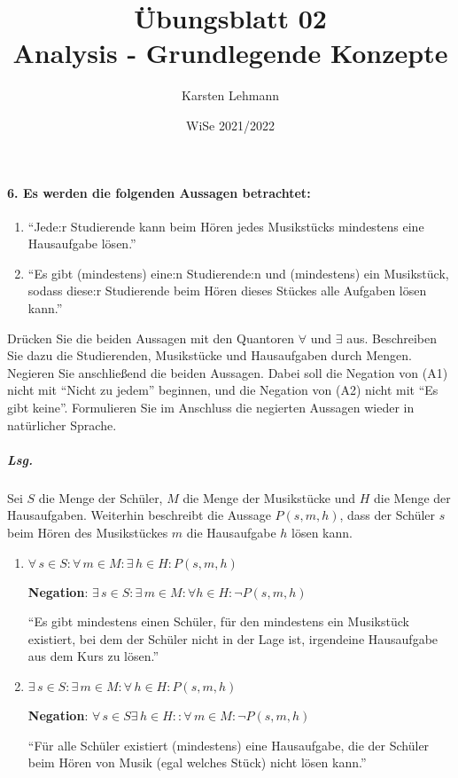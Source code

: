 \documentclass{scrreprt}
\author{Karsten Lehmann}
\date{WiSe 2021/2022}
\title{Übungsblatt 02\\Analysis - Grundlegende Konzepte}
\begin{document}
\paragraph{6. Es werden die folgenden Aussagen betrachtet:}
\begin{enumerate}[label={(A\arabic*)}]
\item ``Jede:r Studierende kann beim Hören jedes Musikstücks mindestens
  eine Hausaufgabe lösen.''
\item ``Es gibt (mindestens) eine:n Studierende:n und (mindestens) ein
  Musikstück, sodass diese:r Studierende beim Hören dieses Stückes alle
  Aufgaben lösen kann.''
\end{enumerate}

Drücken Sie die beiden Aussagen mit den Quantoren $\forall$ und $\exists$ aus.
Beschreiben Sie dazu die Studierenden, Musikstücke und Hausaufgaben durch Mengen.
Negieren Sie anschließend die beiden Aussagen.
Dabei soll die Negation von (A1) nicht mit ``Nicht zu jedem'' beginnen,
und die Negation von (A2) nicht mit ``Es gibt keine''.
Formulieren Sie im Anschluss die negierten Aussagen wieder in natürlicher
Sprache.

\subparagraph{Lsg.} Sei $S$ die Menge der Schüler, $M$ die Menge der Musikstücke
und $H$ die Menge der Hausaufgaben.
Weiterhin beschreibt die Aussage $P(s, m, h)$, dass der Schüler $s$
beim Hören des Musikstückes $m$ die Hausaufgabe $h$ lösen kann.

\begin{enumerate}[label={(A\arabic*})]
\item $\forall \, s \in S \colon \forall \, m \in M \colon \exists \, h \in H \colon P(s, m, h)$

  \textbf{Negation}: $\exists \, s \in S \colon \exists \, m \in M \colon \forall h \in H \colon \neg P(s, m, h)$

  ``Es gibt mindestens einen Schüler, für den mindestens ein Musikstück
  existiert, bei dem der Schüler nicht in der Lage ist, irgendeine Hausaufgabe
  aus dem Kurs zu lösen.''

\item $\exists \, s \in S \colon \exists \, m \in M \colon \forall \, h \in H \colon P(s, m, h)$

  \textbf{Negation}: $\forall \, s \in S \exists \, h \in H \colon \colon \forall \, m \in M \colon \neg P(s, m, h)$

  ``Für alle Schüler existiert (mindestens) eine Hausaufgabe, die der Schüler
  beim Hören von Musik (egal welches Stück) nicht lösen kann.''
\end{enumerate}
\end{document}
